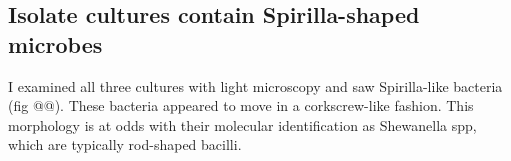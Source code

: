 \documentclass{article}
\begin{document}
\subsection*{Isolate cultures contain Spirilla-shaped microbes}

I examined all three cultures with light microscopy and saw
Spirilla-like bacteria (fig @@).  These bacteria appeared to move in a
corkscrew-like fashion.  This morphology is at odds with their
molecular identification as Shewanella spp, which are typically
rod-shaped bacilli.
\end{document}
